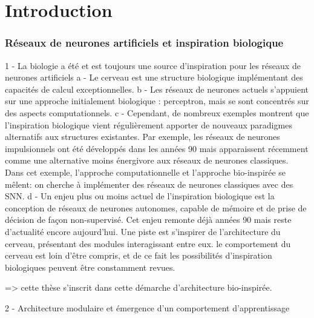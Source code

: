 \chapter*{Introduction}

\subsection*{Réseaux de neurones artificiels et inspiration biologique}

1 - La biologie a été et est toujours une source d'inspiration pour les réseaux de neurones artificiels
    a - Le cerveau est une structure biologique implémentant des capacités de calcul exceptionnelles.
    b - Les réseaux de neurones actuels s'appuient sur une approche initialement biologique : perceptron, mais se sont concentrés sur des aspects computationnels.
    c - Cependant, de nombreux exemples montrent que l'inspiration biologique vient régulièrement apporter de nouveaux paradigmes alternatifs aux structures existantes.
    Par exemple, les réseaux de neurones impulsionnels ont été développés dans les années 90 mais apparaissent récemment comme une alternative moins énergivore aux réseaux de neurones classiques.
    Dans cet exemple, l'approche computationnelle et l'approche bio-inspirée se mêlent: on cherche à implémenter des réseaux de neurones classiques avec des SNN.
    d - Un enjeu plus ou moins actuel de l'inspiration biologique est la conception de réseaux de neurones autonomes, capable de mémoire et de prise de décision de façon non-supervisé. 
    Cet enjeu remonte déjà années 90 mais reste d'actualité encore aujourd'hui. 
    Une piste est s'inspirer de l'architecture du cerveau, présentant des modules interagissant entre eux. le comportement du cerveau est loin d'être compris, et de ce fait les possibilités d'inspiration biologiques peuvent être constamment revues.

=> cette thèse s'inscrit dans cette démarche d'architecture bio-inspirée.

2 - Architecture modulaire et émergence d'un comportement d'apprentissage

